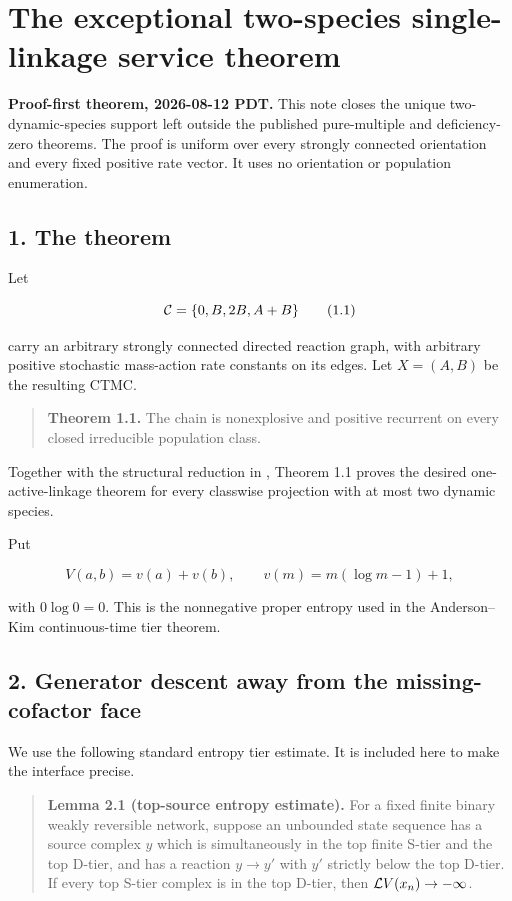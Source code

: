 \section{The exceptional two-species single-linkage service
theorem}

\textbf{Proof-first theorem, 2026-08-12 PDT.} This note closes the
unique two-dynamic-species support left outside the published
pure-multiple and deficiency-zero theorems. The proof is uniform over
every strongly connected orientation and every fixed positive rate
vector. It uses no orientation or population enumeration.

\subsection{1. The theorem}

Let

\[
               {\cal C}=\{0,B,2B,A+B\}                         \tag{1.1}
\]

carry an arbitrary strongly connected directed reaction graph, with
arbitrary positive stochastic mass-action rate constants on its edges.
Let \(X=(A,B)\) be the resulting CTMC.

\begin{quote}
\textbf{Theorem 1.1.} The chain is nonexplosive and positive recurrent
on every closed irreducible population class.
\end{quote}

Together with the structural reduction in
\texttt{}, Theorem 1.1
proves the desired one-active-linkage theorem for every classwise
projection with at most two dynamic species.

Put

\[
 V(a,b)=v(a)+v(b),\qquad
 v(m)=m(\log m-1)+1,                                          \tag{1.2}
\]

with \(0\log0=0\). This is the nonnegative proper entropy used in the
Anderson--Kim continuous-time tier theorem.

\subsection{2. Generator descent away from the missing-cofactor
face}

We use the following standard entropy tier estimate. It is included here
to make the interface precise.

\begin{quote}
\textbf{Lemma 2.1 (top-source entropy estimate).} For a fixed finite
binary weakly reversible network, suppose an unbounded state sequence
has a source complex \(y\) which is simultaneously in the top finite
S-tier and the top D-tier, and has a reaction \(y\to y'\) with \(y'\)
strictly below the top D-tier. If every top S-tier complex is in the top
D-tier, then \({\cal L}V(x_n)\to-\infty\).
\end{quote}

